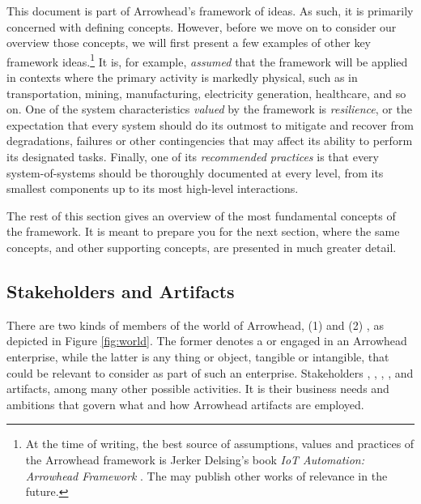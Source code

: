 This document is part of Arrowhead's framework of ideas.
As such, it is primarily concerned with defining concepts.
However, before we move on to consider our overview those concepts, we will first present a few examples of other key framework ideas.\footnote{
  At the time of writing, the best source of assumptions, values and practices of the Arrowhead framework is Jerker Delsing's book \textit{{IoT} Automation: Arrowhead Framework} \cite{delsing2017iot}.
  The  may publish other works of relevance in the future.
}
It is, for example, \textit{assumed} that the framework will be applied in contexts where the primary activity is markedly physical, such as in transportation, mining, manufacturing, electricity generation, healthcare, and so on.
One of the system characteristics \textit{valued} by the framework is \textit{resilience}, or the expectation that every system should do its outmost to mitigate and recover from degradations, failures or other contingencies that may affect its ability to perform its designated tasks.
Finally, one of its \textit{recommended practices} is that every system-of-systems should be thoroughly documented at every level, from its smallest components up to its most high-level interactions.

The rest of this section gives an overview of the most fundamental concepts of the framework.
It is meant to prepare you for the next section, where the same concepts, and other supporting concepts, are presented in much greater detail.

\subsection{Stakeholders and Artifacts}

There are two kinds of members of the world of Arrowhead, (1)  and (2) , as depicted in Figure \ref{fig:world}.
The former denotes a  or  engaged in an Arrowhead enterprise, while the latter is any thing or object, tangible or intangible, that could be relevant to consider as part of such an enterprise.
Stakeholders , , , , and  artifacts, among many other possible activities.
It is their business needs and ambitions that govern what and how Arrowhead artifacts are employed.

